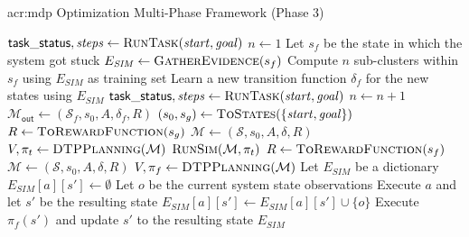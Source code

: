 \begin{algorithm}[t!]
	\caption{\acrshort{acr:mdp} Optimization Multi-Phase Framework (Phase 3)}
	\label{alg:multi-phase-fine-tuning}
	\begin{algorithmic}[1]
		\Statex
			\State $\mathsf{task\_status}, \mathit{steps} \gets \textproc{RunTask}(\mathit{start}, \mathit{goal})$
			\State $n \gets 1$
				\State Let $s_f$ be the state in which the system got stuck
				\State $E_\mathit{SIM} \gets \textproc{GatherEvidence}(s_f)$
				\State Compute $n$ sub-clusters within $s_f$ using $E_\mathit{SIM}$ as training set
				\State Learn a new transition function $\delta_f$ for the new states using $E_\mathit{SIM}$
				\State $\mathsf{task\_status}, \mathit{steps} \gets \textproc{RunTask}(\mathit{start}, \mathit{goal})$
				\State $n \gets n + 1$ 
			\EndWhile
		\EndFor
		\State\Return $\mathcal{M}_\mathsf{out} \gets (\mathcal{S}_f, s_0, A, \delta_f, R)$ 
		\EndFunction
		\Statex
			\State $(s_0, s_g) \gets \textproc{ToStates}(\{\mathit{start}, \mathit{goal}\})$
			\State $R \gets \textproc{ToRewardFunction}(s_g)$
			\State $\mathcal{M} \gets (\mathcal{S}, s_0, A, \delta, R)$
			\State $V, \pi_t \gets \textproc{DTPPlanning}(\mathcal{M})$
			\State\Return $\textproc{RunSim}(\mathcal{M}, \pi_t)$	
		\EndFunction
		\Statex
			\State $R \gets \textproc{ToRewardFunction}(s_f)$
			\State $\mathcal{M} \gets (\mathcal{S}, s_0, A, \delta, R)$
			\State $V, \pi_f \gets \textproc{DTPPlanning}(\mathcal{M})$
			\State Let $E_\mathit{SIM}$ be a dictionary
				\State $E_\mathit{SIM}[a][s'] \gets \emptyset$
			\EndFor
				 
				\State Let $o$ be the current system state observations
				\State Execute $a$ and let $s'$ be the resulting state
				\State $E_\mathit{SIM}[a][s'] \gets E_\mathit{SIM}[a][s'] \cup \{o\}$	
				 
					\State Execute $\pi_f(s')$ and update $s'$ to the resulting state
				\EndWhile
			\EndFor
			\State\Return $E_\mathit{SIM}$
		\EndFunction
	\end{algorithmic}
\end{algorithm}

